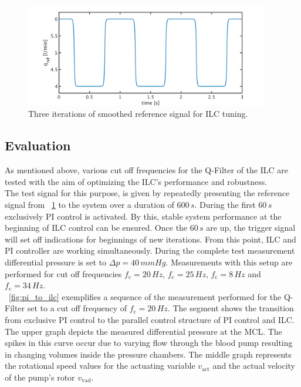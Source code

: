 \begin{figure}[ht]
  \centering
  \includegraphics[width=0.95\textwidth]{images/chapt_5/ILC/ref_signal_ILC3.pdf}
  \caption[Smoothed reference signal for ILC tuning]{Three iterations of smoothed reference signal for ILC tuning.}
  \label{fig:ref_signal_ILC3}
\end{figure}
\subsection{Evaluation}
As mentioned above, various cut off frequencies for the Q-Filter of the ILC are tested with the aim of optimizing the ILC's performance and robustness.  \\The test signal for this purpose, is given by repeatedly presenting the reference signal from \figurename~\ref{fig:ref_signal_ILC3} to the system over a duration of $600\,s$. During the first $60\,s$ exclusively PI control is activated. By this, stable system performance at the beginning of ILC control can be ensured. Once the $60\,s$ are up, the trigger signal will set off indications for beginnings of new iterations. From this point, ILC and PI controller are working simultaneously. During the complete test measurement differential pressure is set to $\Delta{p}=40\,mmHg$. Measurements with this setup are performed for cut off frequencies $f_{\mathrm{c}}=20\,Hz$, $f_{\mathrm{c}}=25\,Hz$, $f_{\mathrm{c}}=8\,Hz$ and $f_{\mathrm{c}}=34\,Hz$.
\\\figurename~\ref{fig:pi_to_ilc} exemplifies a sequence of the measurement performed for the Q-Filter set to a cut off frequency of $f_{\mathrm{c}}=20\,Hz$. The segment shows the transition from exclusive PI control to the parallel control structure of PI control and ILC. The upper graph depicts the measured differential pressure at the MCL. The spikes in this curve occur due to varying flow through the blood pump resulting in changing volumes inside the pressure chambers. The middle graph represents the rotational speed values for the actuating variable $v_{\mathrm{act}}$ and the actual velocity of the pump's rotor $v_{\mathrm{vad}}$.

